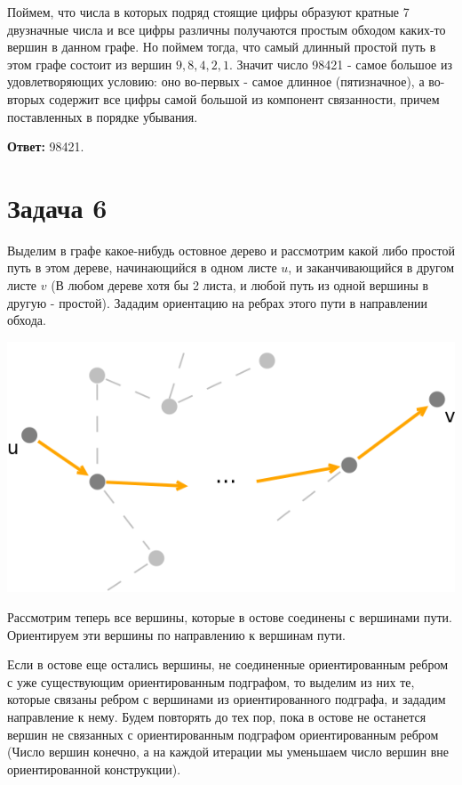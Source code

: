 \documentclass{article}
\begin{document}
	Поймем, что числа в которых подряд стоящие цифры образуют кратные 7 двузначные числа и все цифры различны получаются простым обходом каких-то вершин в данном графе. Но поймем тогда, что самый длинный простой путь в этом графе состоит из вершин $9, 8, 4, 2, 1$. Значит число 98421 - самое большое из удовлетворяющих условию: оно во-первых - самое длинное (пятизначное), а во-вторых содержит все цифры самой большой из компонент связанности, причем поставленных в порядке убывания.
	
	\textbf{Ответ:} 98421.
	
	\section{Задача 6}
	Выделим в графе какое-нибудь остовное дерево и рассмотрим какой либо простой путь в этом дереве, начинающийся в одном листе $u$, и заканчивающийся в другом листе $v$ (В любом дереве хотя бы 2 листа, и любой путь из одной вершины в другую - простой). Зададим ориентацию на ребрах этого пути в направлении обхода.
	
	\includegraphics[scale=0.6]{6_1}
	
	Рассмотрим теперь все вершины, которые в остове соединены с вершинами пути. Ориентируем эти вершины по направлению к вершинам пути. 
	
	Если в остове еще остались вершины, не соединенные ориентированным ребром с уже существующим ориентированным подграфом, то выделим из них те, которые связаны ребром с вершинами из ориентированного подграфа, и зададим направление к нему. Будем повторять до тех пор, пока в остове не останется вершин не связанных с ориентированным подграфом ориентированным ребром (Число вершин конечно, а на каждой итерации мы уменьшаем число вершин вне ориентированной конструкции). 
	
\end{document}
